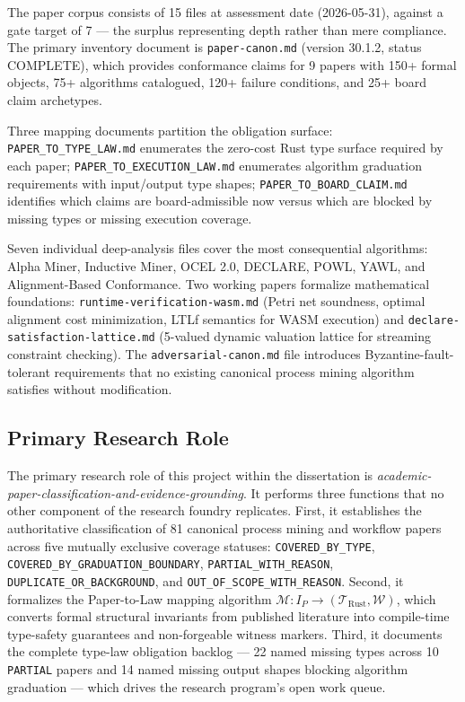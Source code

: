 The paper corpus consists of 15 files at assessment date (2026-05-31), against
a gate target of 7 --- the surplus representing depth rather than mere
compliance. The primary inventory document is
\texttt{paper-canon.md} (version 30.1.2, status COMPLETE), which provides
conformance claims for 9 papers with 150+ formal objects, 75+ algorithms
catalogued, 120+ failure conditions, and 25+ board claim archetypes.

Three mapping documents partition the obligation surface:
\texttt{PAPER\_TO\_TYPE\_LAW.md} enumerates the zero-cost Rust type surface
required by each paper; \texttt{PAPER\_TO\_EXECUTION\_LAW.md} enumerates
algorithm graduation requirements with input/output type shapes;
\texttt{PAPER\_TO\_BOARD\_CLAIM.md} identifies which claims are board-admissible
now versus which are blocked by missing types or missing execution coverage.

Seven individual deep-analysis files cover the most consequential algorithms:
Alpha Miner, Inductive Miner, OCEL 2.0, DECLARE, POWL, YAWL, and
Alignment-Based Conformance. Two working papers formalize mathematical
foundations: \texttt{runtime-verification-wasm.md} (Petri net soundness,
optimal alignment cost minimization, LTLf semantics for WASM execution) and
\texttt{declare-satisfaction-lattice.md} (5-valued dynamic valuation lattice
for streaming constraint checking). The \texttt{adversarial-canon.md} file
introduces Byzantine-fault-tolerant requirements that no existing canonical
process mining algorithm satisfies without modification.

\subsection{Primary Research Role}
\label{sec:sources-papers-identity-role}

The primary research role of this project within the dissertation is
\emph{academic-paper-classification-and-evidence-grounding}. It performs three
functions that no other component of the research foundry replicates. First, it
establishes the authoritative classification of 81 canonical process mining
and workflow papers across five mutually exclusive coverage statuses:
\texttt{COVERED\_BY\_TYPE}, \texttt{COVERED\_BY\_GRADUATION\_BOUNDARY},
\texttt{PARTIAL\_WITH\_REASON}, \texttt{DUPLICATE\_OR\_BACKGROUND}, and
\texttt{OUT\_OF\_SCOPE\_WITH\_REASON}. Second, it formalizes the Paper-to-Law
mapping algorithm $\mathcal{M}: I_P \to (\mathcal{T}_{\text{Rust}},
\mathcal{W})$, which converts formal structural invariants from published
literature into compile-time type-safety guarantees and non-forgeable witness
markers. Third, it documents the complete type-law obligation backlog --- 22
named missing types across 10 \texttt{PARTIAL} papers and 14 named missing
output shapes blocking algorithm graduation --- which drives the research
program's open work queue.

